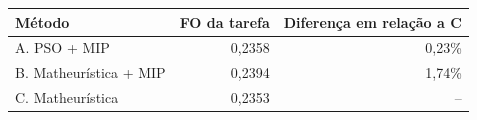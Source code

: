 \begin{tabular}{lrr}
\toprule
Método & FO da tarefa & Diferença em relação a C \\
\midrule
A. PSO + MIP & 0,2358 & 0,23\% \\
B. Matheurística + MIP & 0,2394 & 1,74\% \\
C. Matheurística & 0,2353 & -- \\
\bottomrule
\end{tabular}
